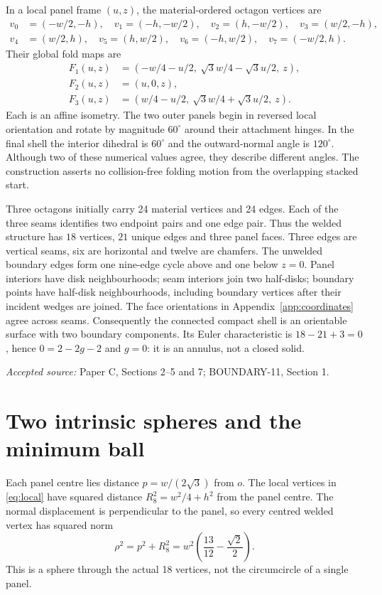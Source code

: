 \documentclass[11pt,a4paper]{article}
\newcommand{\source}[1]{\par{\small\emph{Accepted source:} #1}\par}
\begin{document}
In a local panel frame $(u,z)$, the material-ordered octagon vertices are
\begin{equation}\label{eq:local}
\begin{split}
v_0&=(-w/2,-h),\quad v_1=(-h,-w/2),\quad v_2=(h,-w/2),\quad v_3=(w/2,-h),\\
v_4&=(w/2,h),\quad v_5=(h,w/2),\quad v_6=(-h,w/2),\quad v_7=(-w/2,h).
\end{split}
\end{equation}
Their global fold maps are
\begin{equation}\label{eq:fold}
\begin{aligned}
F_1(u,z)&=(-w/4-u/2,\ \sqrt3w/4-\sqrt3u/2,\ z),\\
F_2(u,z)&=(u,0,z),\\
F_3(u,z)&=(w/4-u/2,\ \sqrt3w/4+\sqrt3u/2,\ z).
\end{aligned}
\end{equation}
Each is an affine isometry. The two outer panels begin in reversed local orientation and rotate by magnitude $60^\circ$ around their attachment hinges. In the final shell the interior dihedral is $60^\circ$ and the outward-normal angle is $120^\circ$. Although two of these numerical values agree, they describe different angles. The construction asserts no collision-free folding motion from the overlapping stacked start.

Three octagons initially carry 24 material vertices and 24 edges. Each of the three seams identifies two endpoint pairs and one edge pair. Thus the welded structure has $18$ vertices, $21$ unique edges and three panel faces. Three edges are vertical seams, six are horizontal and twelve are chamfers. The unwelded boundary edges form one nine-edge cycle above and one below $z=0$. Panel interiors have disk neighbourhoods; seam interiors join two half-disks; boundary points have half-disk neighbourhoods, including boundary vertices after their incident wedges are joined. The face orientations in Appendix~\ref{app:coordinates} agree across seams. Consequently the connected compact shell is an orientable surface with two boundary components. Its Euler characteristic is $18-21+3=0$, hence $0=2-2g-2$ and $g=0$: it is an annulus, not a closed solid.
\source{Paper C, Sections 2--5 and 7; BOUNDARY-11, Section 1.}

\section{Two intrinsic spheres and the minimum ball}\label{sec:spheres}
Each panel centre lies distance $p=w/(2\sqrt3)$ from $o$. The local vertices in \eqref{eq:local} have squared distance $R_8^2=w^2/4+h^2$ from the panel centre. The normal displacement is perpendicular to the panel, so every centred welded vertex has squared norm
\begin{equation}\label{eq:rho}
\rho^2=p^2+R_8^2
=w^2\left(\frac{13}{12}-\frac{\sqrt2}{2}\right).
\end{equation}
This is a sphere through the actual 18 vertices, not the circumcircle of a single panel.
\end{document}
